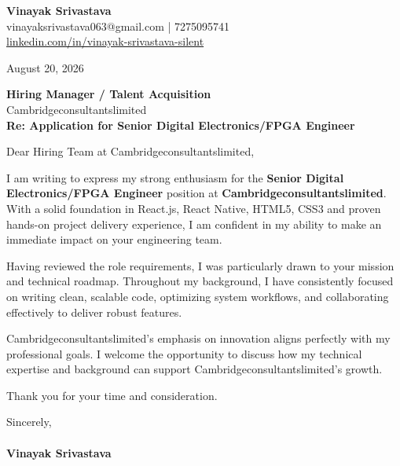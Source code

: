 \documentclass[11pt,a4paper]{article}
\begin{document}
\thispagestyle{empty}

{\Large \textbf{Vinayak Srivastava}}\\
vinayaksrivastava063@gmail.com | 7275095741 \\
\url{linkedin.com/in/vinayak-srivastava-silent}

\vspace{1em}
\hfill August 20, 2026

\textbf{Hiring Manager / Talent Acquisition}\\
Cambridgeconsultantslimited\\

\vspace{1.5em}
\textbf{Re: Application for Senior Digital Electronics/FPGA Engineer}

\vspace{1em}
Dear Hiring Team at Cambridgeconsultantslimited,

I am writing to express my strong enthusiasm for the \textbf{Senior Digital Electronics/FPGA Engineer} position at \textbf{Cambridgeconsultantslimited}. With a solid foundation in React.js, React Native, HTML5, CSS3 and proven hands-on project delivery experience, I am confident in my ability to make an immediate impact on your engineering team.

Having reviewed the role requirements, I was particularly drawn to your mission and technical roadmap. Throughout my background, I have consistently focused on writing clean, scalable code, optimizing system workflows, and collaborating effectively to deliver robust features.

Cambridgeconsultantslimited's emphasis on innovation aligns perfectly with my professional goals. I welcome the opportunity to discuss how my technical expertise and background can support Cambridgeconsultantslimited's growth.

Thank you for your time and consideration.

\vspace{1.5em}
Sincerely,\\
\vspace{1em}\\
\textbf{Vinayak Srivastava}
\end{document}
